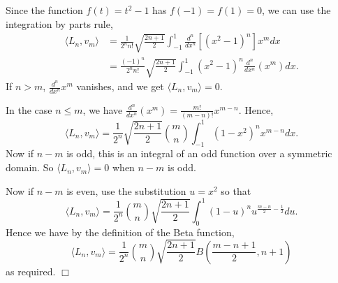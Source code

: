 \documentclass[10pt]{article}
\newenvironment{proof}[1][Proof]{\begin{trivlist}
\item[\hskip \labelsep {\bfseries #1}]}{\end{trivlist}}
\begin{document}
        \begin{proof}
            Since the function $f(t) = t^2-1$ has $f(-1) = f(1) = 0$, we can use the integration
            by parts rule,
            \begin{align*}
                \langle L_n,v_m\rangle &= \frac{1}{2^nn!}\sqrt{\frac{2n+1}{2}}\int_{-1}^1\frac{d^n}{dx^n}[(x^2-1)^n]x^mdx\\
                &= \frac{(-1)^n}{2^n n!}\sqrt{\frac{2n+1}{2}}\int_{-1}^1(x^2-1)^n\frac{d^n}{dx^n}(x^m)dx.
            \end{align*}
            If $n > m$, $\frac{d^n}{dx^n}x^m$ vanishes, and we get $\langle L_n,v_m\rangle = 0$. 
            
            In the case $n \leq m$, we have $\frac{d^n}{dx^n}(x^m) = \frac{m!}{(m-n)!}x^{m-n}$. Hence,
            \begin{equation*}
                \langle L_n,v_m\rangle = \frac{1}{2^n}\sqrt{\frac{2n+1}{2}}{m\choose n} \int_{-1}^1(1-x^2)^nx^{m-n}dx.
            \end{equation*}
            Now if $n-m$ is odd, this is an integral of an odd function over a symmetric
            domain. So $\langle L_n,v_m\rangle = 0$ when $n-m$ is odd.
            
            Now if $n-m$ is even,  use the substitution $u = x^2$ so that
            \begin{equation*}
                \langle L_n,v_m\rangle = \frac{1}{2^n}{m\choose n}\sqrt{\frac{2n+1}{2}}\int_{0}^1(1-u)^nu^{\frac{m-n}{2}-\frac{1}{2}}du.
            \end{equation*}
            Hence we have by the definition of the Beta function,
            \begin{equation*}
                \langle L_n,v_m\rangle = \frac{1}{2^n}{m\choose n}\sqrt{\frac{2n+1}{2}}B(\frac{m-n+1}{2},n+1)
            \end{equation*}
            as required. $\Box$
        \end{proof}
        
\end{document}
